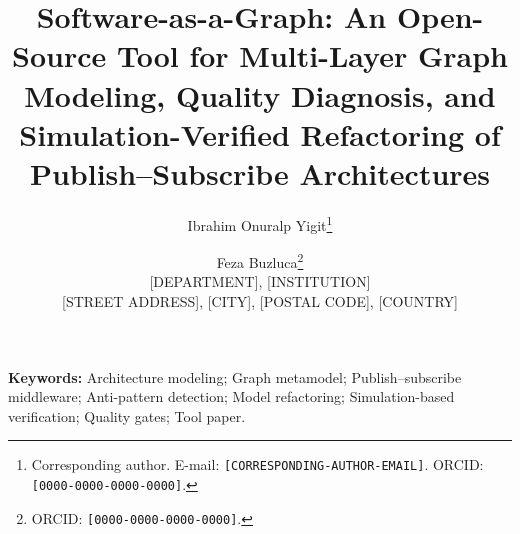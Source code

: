 \documentclass[11pt,a4paper]{article}
\title{\Large\bfseries Software-as-a-Graph: An Open-Source Tool for Multi-Layer Graph Modeling, Quality Diagnosis, and Simulation-Verified Refactoring of Publish--Subscribe Architectures}
\author{
  Ibrahim Onuralp Yigit\thanks{Corresponding author. E-mail: \texttt{[CORRESPONDING-AUTHOR-EMAIL]}. ORCID: \texttt{[0000-0000-0000-0000]}.}
  \and
  Feza Buzluca\thanks{ORCID: \texttt{[0000-0000-0000-0000]}.}
  \\[6pt]
  \normalsize [DEPARTMENT], [INSTITUTION] \\
  \normalsize [STREET ADDRESS], [CITY], [POSTAL CODE], [COUNTRY]
}
\date{}
\begin{document}
\maketitle

\begin{abstract}

\end{abstract}

\textbf{Keywords:} Architecture modeling; Graph metamodel; Publish--subscribe middleware; Anti-pattern detection; Model refactoring; Simulation-based verification; Quality gates; Tool paper.

\linenumbers

















\appendix

\end{document}
